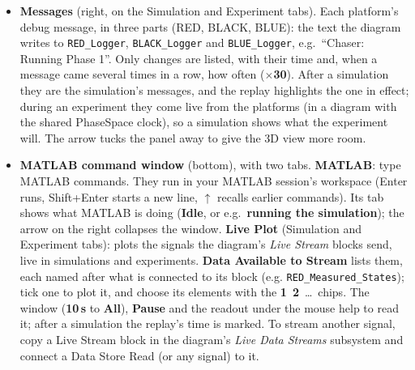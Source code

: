 \documentclass[11pt,a4paper]{article}
\newcommand{\ui}[1]{\textsf{\textbf{#1}}}
\newcommand{\pth}[1]{\texttt{#1}}
\newcommand{\fn}[1]{\texttt{#1}}
\begin{document}
\begin{itemize}
        black Phillips screws in its panels and aluminium frame (the links follow the joint angles in a replay), the Target in gold MLI, each with the docking cone and solar panels set in the Spacecraft Designer (Section~\ref{sec:designer}), and
        the Obstacle as an aluminium frame with transparent blue plexiglass panels on its sides and top (every platform has its internal structure). The models are solid; a simulation laid over the live view is
        see-through with an outline, and loaded results are faint with a dashed outline.
        The models are made from the lab's SolidWorks assemblies by \pth{build\_cad\_models.py}, which lives outside the
        template, with the CAD it reads (\pth{designs/cad\_tools}); run it again after changing the CAD.
  \item \textbf{Messages} (right, on the Simulation and Experiment tabs). Each platform's debug message, in three
        parts (RED, BLACK, BLUE): the text the diagram writes to \fn{RED\_Logger}, \fn{BLACK\_Logger} and
        \fn{BLUE\_Logger}, e.g.\ ``Chaser: Running Phase 1''. Only changes are listed, with their time and, when a
        message came several times in a row, how often (\ui{$\times$30}). After a simulation they are the
        simulation's messages, and the replay highlights the one in effect; during an experiment they come live from
        the platforms (in a diagram with the shared PhaseSpace clock), so a simulation shows what the experiment will.
        The arrow tucks the panel away to give the 3D view more room.
  \item \textbf{MATLAB command window} (bottom), with two tabs. \ui{MATLAB}: type MATLAB commands. They run in your MATLAB session's
        workspace (Enter runs, Shift+Enter starts a new line, $\uparrow$ recalls earlier commands). Its tab shows what MATLAB is doing (\ui{Idle}, or e.g.\ \ui{running the simulation}); the arrow on the right collapses the window.
        \ui{Live Plot} (Simulation and Experiment tabs): plots the signals the diagram's \emph{Live Stream} blocks send, live in simulations and
        experiments. \ui{Data Available to Stream} lists them, each named after what is connected to its block (e.g.
        \fn{RED\_Measured\_States}); tick one to plot it, and choose its elements with the \ui{1}~\ui{2}~\ldots\ chips.
        The window (\ui{10\,s} to \ui{All}), \ui{Pause} and the readout under the mouse help to read it; after a
        simulation the replay's time is marked. To stream another signal, copy a Live Stream block in the diagram's
        \emph{Live Data Streams} subsystem and connect a Data Store Read (or any signal) to it.
\end{itemize}
\end{document}
